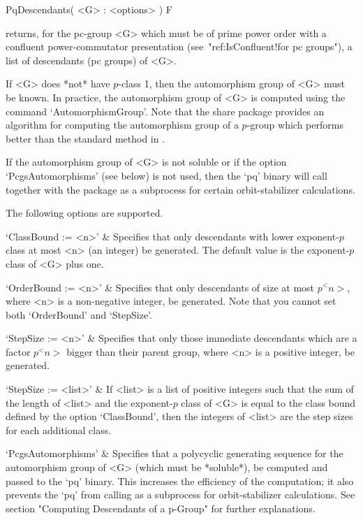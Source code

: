 \>PqDescendants( <G> : <options> ) F

returns, for the pc-group <G> which must be of prime power order  with  a
confluent  power-commutator  presentation  (see~"ref:IsConfluent!for   pc
groups"), a list of descendants (pc groups) of <G>.

If <G> does *not* have $p$-class 1, then the automorphism  group  of  <G>
must be known. In practice, the automorphism group  of  <G>  is  computed
using the {\GAP} command `AutomorphismGroup'. Note that the {\GAP}  share
package {\AutPGrp} provides an algorithm for computing  the  automorphism
group of a $p$-group which performs better than the  standard  method  in
{\GAP}.

If the automorphism group  of  <G>  is  not  soluble  or  if  the  option
`PcgsAutomorphisms' (see below) is not used, then the  `pq'  binary  will
call {\GAP} together with the {\AutPGrp}  package  as  a  subprocess  for
certain orbit-stabilizer calculations.

The following options are supported.

\beginitems

`ClassBound := <n>' &
Specifies that only descendants with lower exponent-$p$ class at most <n>
(an integer) be generated. The default value is the exponent-$p$ class of
<G> plus one.

`OrderBound := <n>' &
Specifies that only descendants of size at most $p^<n>$, where <n>  is  a
non-negative integer,  be  generated.  Note  that  you  cannot  set  both
`OrderBound' and `StepSize'.

`StepSize := <n>' &
Specifies that only  those  immediate  descendants  which  are  a  factor
$p^<n>$ bigger than their parent group, where <n> is a positive  integer,
be generated.

`StepSize := <list>' &
If <list> is a list of positive integers such that the sum of the  length
of <list> and the exponent-$p$ class of <G> is equal to the  class  bound
defined by the option `ClassBound', then the integers of <list>  are  the
step sizes for each additional class.

`PcgsAutomorphisms' &
Specifies that a polycyclic  generating  sequence  for  the  automorphism
group of <G> (which must be *soluble*), be computed  and  passed  to  the
`pq' binary. This increases the efficiency of the  computation;  it  also
prevents  the  `pq'   from   calling   {\GAP}   as   a   subprocess   for
orbit-stabilizer calculations. See section "Computing  Descendants  of  a
p-Group" for further explanations.

